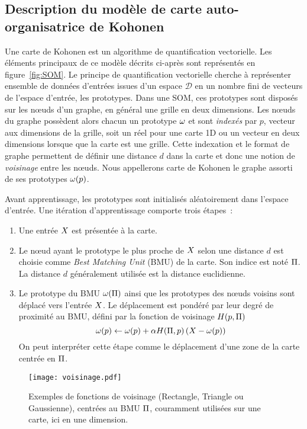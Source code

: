 \documentclass[../main]{subfiles}
\begin{document}
\subsection{Description du modèle de carte auto-organisatrice de Kohonen}

Une carte de Kohonen est un algorithme de quantification vectorielle. 
Les éléments principaux de ce modèle décrits ci-après sont représentés en figure~\ref{fig:SOM}.
Le principe de quantification vectorielle cherche à représenter ensemble de données d'entrées issues d'un espace $\mathcal{D}$ en un nombre fini de vecteurs de l'espace d'entrée, les prototypes.
Dans une SOM, ces prototypes sont disposés sur les n\oe{}uds d'un graphe, en général une grille en deux dimensions.
Les n\oe{}uds du graphe possèdent alors chacun un prototype $\omega$ et sont \emph{indexés} par $p$, vecteur aux dimensions de la grille, soit un réel pour une carte 1D ou un vecteur en deux dimensions lorsque que la carte est une grille.
Cette indexation et le format de graphe permettent de définir une distance $d$ dans la carte et donc une notion de \emph{voisinage} entre les n\oe{}uds. Nous appellerons carte de Kohonen le graphe assorti de ses prototypes $\omega(p)$.

Avant apprentissage, les prototypes sont initialisés aléatoirement dans l'espace d'entrée.
Une itération d'apprentissage comporte trois étapes~:
\begin{enumerate}
\item Une entrée $X$ est présentée à la carte.
\item Le n\oe{}ud ayant le prototype le plus proche de $X$ selon une distance $d$ est choisie comme \emph{Best Matching Unit} (BMU) de la carte. Son indice est noté $\Pi$. La distance $d$ généralement utilisée est la distance euclidienne.
\item Le prototype du BMU $\omega(\Pi)$ ainsi que les prototypes des n\oe{}uds voisins sont déplacé vers l'entrée $X$. Le déplacement est pondéré par leur degré de proximité au BMU, défini par la fonction de voisinage $H(p,\Pi)$
$$ \omega(p) \leftarrow \omega(p) + \alpha H(\Pi,p) \left( X - \omega(p)\right)$$
On peut interpréter cette étape comme le déplacement d'une zone de la carte centrée en $\Pi$. 
\end{enumerate}

\begin{figure}
     \centering
     \texttt{[image: voisinage.pdf]}
     \caption{Exemples de fonctions de voisinage (Rectangle, Triangle ou Gaussienne), centrées au BMU $\Pi$, couramment utilisées sur une carte, ici en une dimension.}
\end{figure}
\end{document}
